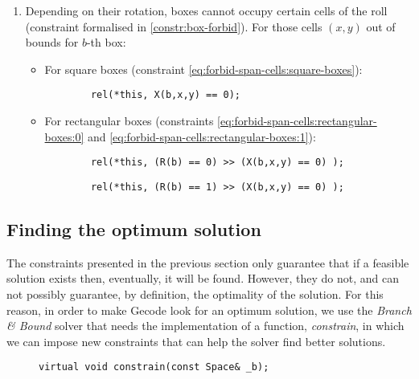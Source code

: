 \begin{enumerate}
    \item Depending on their rotation, boxes cannot occupy certain cells of the
    roll (constraint formalised in \ref{constr:box-forbid}). For those cells $(x,y)$
    out of bounds for $b$-th box:
    
    \begin{itemize}
		\item For square boxes (constraint \ref{eq:forbid-span-cells:square-boxes}):
		{\NOINDENT \begin{lstlisting}
		rel(*this, X(b,x,y) == 0);
		\end{lstlisting}}
		
		\item For rectangular boxes (constraints \ref{eq:forbid-span-cells:rectangular-boxes:0}
		and \ref{eq:forbid-span-cells:rectangular-boxes:1}):
		{\NOINDENT \begin{lstlisting}
		rel(*this, (R(b) == 0) >> (X(b,x,y) == 0) );
		\end{lstlisting}}
		{\NOINDENT \begin{lstlisting}
		rel(*this, (R(b) == 1) >> (X(b,x,y) == 0) );
		\end{lstlisting}}
	\end{itemize}
    
\end{enumerate}

\subsection{Finding the optimum solution}
\label{sec:constraint-programming:optimum}

The constraints presented in the previous section only guarantee that if a
feasible solution exists then, eventually, it will be found. However, they
do not, and can not possibly guarantee, by definition, the optimality of the
solution. For this reason, in order to make Gecode look for an optimum solution,
we use the \textit{Branch \& Bound} solver that needs the implementation of
a function, \textit{constrain}, in which we can impose new constraints that
can help the solver find better solutions.

\begin{figure}[H]
	\centering
	{\NOINDENT \begin{lstlisting}[xleftmargin=.24\textwidth]
	virtual void constrain(const Space& _b);
	\end{lstlisting}}
	\label{fig:constrain-header}
\end{figure}

